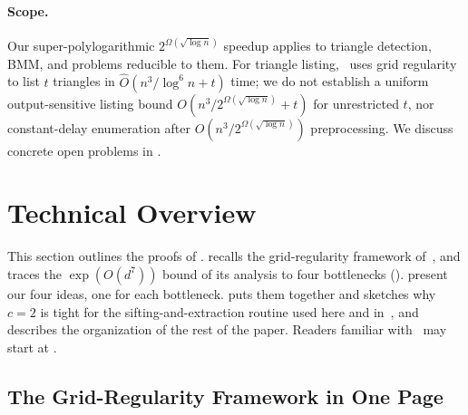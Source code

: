 \documentclass[11pt]{article}
\theoremstyle{definition}
\renewcommand{\label}[1]{}%
\begin{document}
\paragraph{Scope.}
Our super-polylogarithmic $2^{\Omega(\sqrt{\log n})}$ speedup applies to triangle detection, BMM, and problems reducible to them. For triangle listing,~\cite[Section~7]{AFKLM24} uses grid regularity to list $t$ triangles in $\hat{O}(n^3 / \log^6 n + t)$ time; we do not establish a uniform output-sensitive listing bound $O(n^3 / 2^{\Omega(\sqrt{\log n})} + t)$ for unrestricted $t$, nor constant-delay enumeration after $O(n^3 / 2^{\Omega(\sqrt{\log n})})$ preprocessing. We discuss concrete open problems in .

\section{Technical Overview}
\label{sec:overview}

This section outlines the proofs of .  recalls the grid-regularity framework of~\cite{AFKLM24}, and  traces the $\exp(O(d^7))$ bound of its analysis to four bottlenecks ().  present our four ideas, one for each bottleneck.  puts them together and sketches why $c = 2$ is tight for the sifting-and-extraction routine used here and in~\cite{AFKLM24}, and  describes the organization of the rest of the paper. Readers familiar with~\cite{AFKLM24} may start at .

\subsection{The Grid-Regularity Framework in One Page}
\label{sec:overview-afklm}
\end{document}
